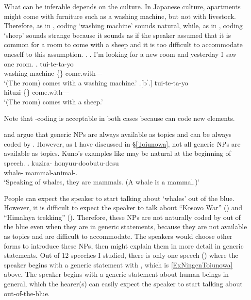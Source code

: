 What can be inferable depends on the culture.
In Japanese culture,
apartments might come with furniture such as a washing machine,
but not with livestock.
Therefore, as in \Next[b],
 coding  `washing machine' sounds natural,
while, as in \Next[b$^{\prime}$],
 coding  `sheep' sounds strange
because it sounds as if the speaker assumed that it is common for a room to come with a sheep
and it is too difficult to accommodate oneself to this assumption.
\ex.\label{ExSentakuki}
 \a. I'm looking for a new room and yesterday I saw one room.
 \bg.  tui-te-ta-yo \\
 	washing-machine-\{\} come.with--- \\
	`(The room) comes with a washing machine.'
 \bg.[b$^{\prime}$.]  tui-te-ta-yo \\
 	hituzi-\{\} come.with--- \\
	`(The room) comes with a sheep.'

Note that -coding is acceptable in both cases
because  can code new elements.

 and  argue that
generic NPs are always available as topics and
can be always coded by .
However, as I have discussed in \S \ref{Toiunowa},
not all generic NPs are available as topics.
Kuno's examples like \Next may be natural at the beginning of speech.
%
\exg. kuzira- honyuu-doobutu-desu \\
      whale- mammal-animal-. \\
      `Speaking of whales, they are mammals. (A whale is a mammal.)'
      \hfill{\cite[44]{kuno73}}

People can expect the speaker to start talking about  `whales' out of the blue.
However, it is difficult to expect the speaker to talk about
``Kosovo War'' () and ``Himalaya trekking'' ().
Therefore,
these NPs  are not naturally coded by  out of the blue
even when they are in generic statements,
because they are not available as topics and are difficult to accommodate.
The speakers would choose other forms to introduce these NPs,
then might explain them in more detail in generic statements.
Out of 12 speeches I studied,
there is only one speech () where the speaker begins with a generic statement with ,
which is \ref{ExNingenToiunowa} above.
The speaker begins with a generic statement about human beings in general,
which the hearer(s) can easily expect the speaker to start talking about out-of-the-blue.

